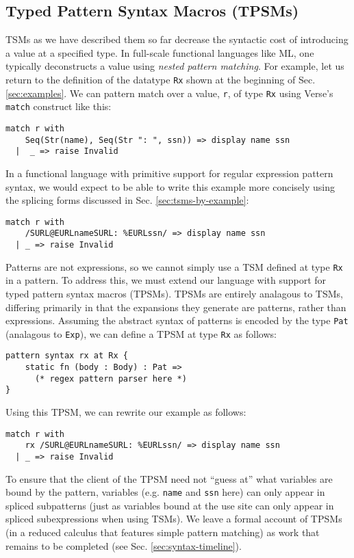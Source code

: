 \subsection{Typed Pattern Syntax Macros (TPSMs)}\label{sec:pattern-tsms}
TSMs as we have described them so far decrease the syntactic cost of introducing a value at a specified type. In full-scale functional languages like ML, one typically deconstructs a value using \emph{nested pattern matching}. For example, let us return to the definition of the datatype \lstinline{Rx} shown at the beginning of Sec. \ref{sec:examples}. We can pattern match over a value, \lstinline{r}, of type \lstinline{Rx} using Verse's \lstinline{match} construct like this:
\begin{lstlisting}[numbers=none]
match r with 
    Seq(Str(name), Seq(Str ": ", ssn)) => display name ssn
  |  _ => raise Invalid
\end{lstlisting}
In a functional language with primitive support for regular expression pattern syntax, we would expect to be able to write this example more concisely using the splicing forms discussed in Sec. \ref{sec:tsms-by-example}:
\begin{lstlisting}[numbers=none]
match r with 
    /SURL@EURLnameSURL: %EURLssn/ => display name ssn
  | _ => raise Invalid
\end{lstlisting}

Patterns are not expressions, so we cannot simply use a TSM defined at type \lstinline{Rx} in a pattern. To address this, we must extend our language with support for typed pattern syntax macros (TPSMs). TPSMs are entirely analagous to TSMs, differing primarily in that the expansions they generate are patterns, rather than expressions. Assuming the abstract syntax of patterns is encoded by the type \lstinline{Pat} (analagous to \lstinline{Exp}), we can define a TPSM at type \lstinline{Rx} as follows:
\begin{lstlisting}[numbers=none]
pattern syntax rx at Rx {
	static fn (body : Body) : Pat => 
	  (* regex pattern parser here *)
}
\end{lstlisting}

Using this TPSM, we can rewrite our example as follows:
\begin{lstlisting}[numbers=none]
match r with 
    rx /SURL@EURLnameSURL: %EURLssn/ => display name ssn
  | _ => raise Invalid
\end{lstlisting}
To ensure that the client of the TPSM need not ``guess at'' what variables are bound by the pattern, variables (e.g. \lstinline{name} and \lstinline{ssn} here) can only appear in spliced subpatterns (just as variables bound at the use site can only appear in spliced subexpressions when using TSMs). We leave a formal account of TPSMs (in a reduced calculus that features simple pattern matching) as work that remains to be completed (see Sec. \ref{sec:syntax-timeline}).

